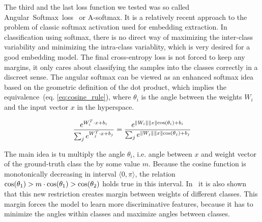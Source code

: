 The third and the last loss function we tested was so called Angular~Softmax~loss~\cite{A_softmax_original} or A-softmax. It is a relatively recent approach to the problem of classic softmax activation used for embedding extraction. In classification using softmax, there is no direct way of maximizing the inter-class variability and minimizing the intra-class variablity, which is very desired for a good embedding model. The final cross-entropy loss is not forced to keep any margins, it only cares about classifying the samples into the classes correctly in a discreet sense. The angular softmax can be viewed as an enhanced softmax idea based on the geometric definition of the dot product, which implies the equivalence~(eq. \ref{eq:cosine_rule}), where $ \theta_i $ is the angle between the weights $ W_i $ and the input vector $ x $ in the hyperspace.

\begin{equation} \label{eq:cosine_rule}
\frac{e^{W_i^T \cdot x + b_i}}{\sum_{j} e^{W_j^T \cdot x + b_j}} =
\frac{e^{\lVert W_i\rVert \lVert x\rVert \textnormal{cos}(\theta_i)  + b_i}}
{\sum_{j} e^{\lVert W_j\rVert \lVert x\rVert \textnormal{cos}(\theta_j)  + b_j}}
\end{equation}

\medskip
\noindent
The main idea is tu multiply the angle $ \theta_i $, i.e. angle between $ x $ and weight vector of the ground-truth class the by some value $ m $. Because the cosine function is monotonically decreasing in interval $ \langle 0, \pi \rangle $, the relation $ \textnormal{cos}(\theta_1) > m \cdot \textnormal{cos}(\theta_1) > \textnormal{cos}(\theta_2) $ holds true in this interval. In~\cite{A_softmax_original} it is also shown that this new restriction creates margin between weights of different classes. This margin forces the model to learn more discriminative features, because it has to minimize the angles within classes and maximize angles between classes.

\medskip
